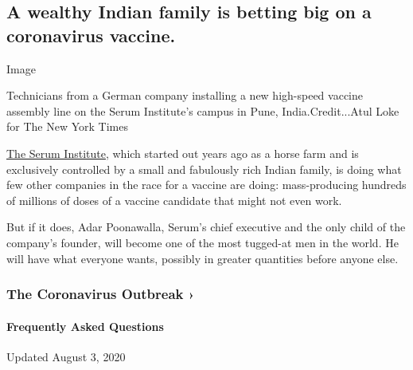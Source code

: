 \hypertarget{a-wealthy-indian-family-is-betting-big-on-a-coronavirus-vaccine}{%
\subsection{A wealthy Indian family is betting big on a coronavirus
vaccine.}\label{a-wealthy-indian-family-is-betting-big-on-a-coronavirus-vaccine}}

Image

Technicians from a German company installing a new high-speed vaccine
assembly line on the Serum Institute's campus in Pune,
India.Credit...Atul Loke for The New York Times

\href{https://www.seruminstitute.com/index.php}{The Serum Institute},
which started out years ago as a horse farm and is exclusively
controlled by a small and fabulously rich Indian family, is doing what
few other companies in the race for a vaccine are doing: mass-producing
hundreds of millions of doses of a vaccine candidate that might not even
work.

But if it does, Adar Poonawalla, Serum's chief executive and the only
child of the company's founder, will become one of the most tugged-at
men in the world. He will have what everyone wants, possibly in greater
quantities before anyone else.

\href{https://www.nytimes3xbfgragh.onion/news-event/coronavirus?action=click\&pgtype=Article\&state=default\&region=MAIN_CONTENT_3\&context=storylines_faq}{}

\hypertarget{the-coronavirus-outbreak-}{%
\subsubsection{The Coronavirus Outbreak
›}\label{the-coronavirus-outbreak-}}

\hypertarget{frequently-asked-questions}{%
\paragraph{Frequently Asked
Questions}\label{frequently-asked-questions}}

Updated August 3, 2020

